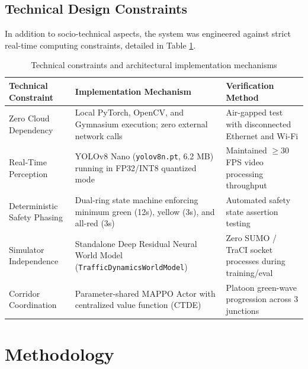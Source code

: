 \subsection{Technical Design Constraints}
In addition to socio-technical aspects, the system was engineered against strict real-time computing constraints, detailed in Table \ref{tab:technical_constraints}.

\begin{table}[htbp]
\centering
\small
\caption{Technical constraints and architectural implementation mechanisms}
\label{tab:technical_constraints}
\begin{tabularx}{\textwidth}{|p{3.5cm}|p{6.0cm}|X|}
\hline
\textbf{Technical Constraint} & \textbf{Implementation Mechanism} & \textbf{Verification Method} \\ \hline
Zero Cloud Dependency & Local PyTorch, OpenCV, and Gymnasium execution; zero external network calls & Air-gapped test with disconnected Ethernet and Wi-Fi \\ \hline
Real-Time Perception & YOLOv8 Nano (\texttt{yolov8n.pt}, 6.2 MB) running in FP32/INT8 quantized mode & Maintained $\ge 30$ FPS video processing throughput \\ \hline
Deterministic Safety Phasing & Dual-ring state machine enforcing minimum green (12s), yellow (3s), and all-red (3s) & Automated safety state assertion testing \\ \hline
Simulator Independence & Standalone Deep Residual Neural World Model (\texttt{TrafficDynamicsWorldModel}) & Zero SUMO / TraCI socket processes during training/eval \\ \hline
Corridor Coordination & Parameter-shared MAPPO Actor with centralized value function (CTDE) & Platoon green-wave progression across 3 junctions \\ \hline
\end{tabularx}
\end{table}

\section{Methodology}
\label{sec:methodology}

